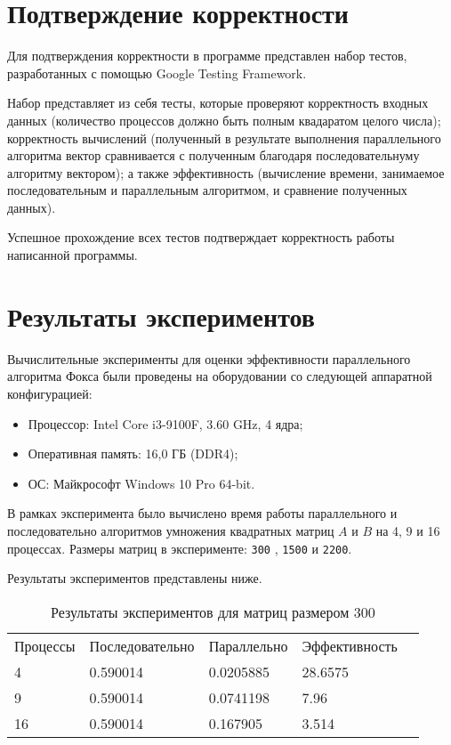 \documentclass{report}
\begin{document}
\newpage

\section*{Подтверждение корректности}
Для подтверждения корректности в программе представлен набор тестов, разработанных с помощью Google Testing Framework.
\par Набор представляет из себя тесты, которые проверяют корректность входных данных (количество процессов должно быть полным квадаратом целого числа); корректность вычислений (полученный в результате выполнения параллельного алгоритма вектор сравнивается с полученным благодаря последовательнуму алгоритму вектором); а также эффективность (вычисление времени, занимаемое последовательным и параллельным алгоритмом, и сравнение полученных данных).
\par Успешное прохождение всех тестов подтверждает корректность работы написанной программы.
\newpage

\section*{Результаты экспериментов}
Вычислительные эксперименты для оценки эффективности параллельного алгоритма Фокса были проведены на оборудовании со следующей аппаратной конфигурацией:

\begin{itemize}
\item Процессор: Intel Core i3-9100F, 3.60 GHz, 4 ядра;
\item Оперативная память: 16,0 ГБ (DDR4);
\item ОС: Майкрософт Windows 10 Pro 64-bit.
\end{itemize}

\par В рамках эксперимента было вычислено время работы параллельного
и последовательно алгоритмов умножения квадратных матриц {\itshape $A$} и {\itshape $B$} на 4, 9 и 16 процессах. Размеры матриц в эксперименте: \verb|300| , \verb|1500| и \verb|2200|.
\par Результаты экспериментов представлены ниже.

\begin{table}[!h]
\caption{Результаты экспериментов для матриц размером 300}
\centering
\begin{tabular}{lllll}
Процессы & Последовательно & Параллельно & Эффективность  \\
4        & 0.590014         & 0.0205885     & 28.6575       \\
9        & 0.590014         & 0.0741198     & 7.96       \\
16       & 0.590014         & 0.167905     & 3.514       
\end{tabular}
\end{table}
\end{document}
